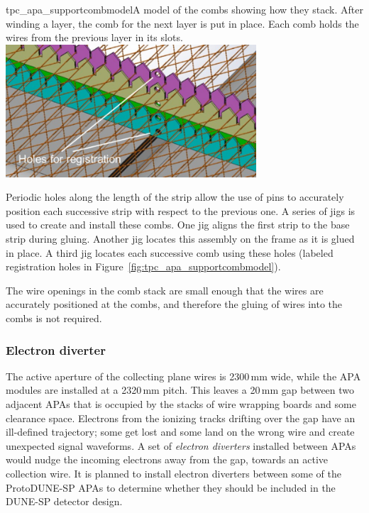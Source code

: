 \begin{cdrfigure}{tpc_apa_supportcombmodel}{A model of the combs showing how they stack.  After winding a layer, the comb for the next layer is put in place.  Each comb holds the wires from the previous layer in its slots.}
\includegraphics[width=0.7\textwidth]{figures/tpc_apa_supportcombmodel.png} 
\end{cdrfigure}

Periodic holes along the length of the strip allow the use of pins to accurately position each successive strip with respect to the previous one.  A series of jigs is used to create and install these combs.  One jig aligns the first strip to the base strip during gluing.  Another jig locates this assembly on the frame as it is glued in place. A third jig locates each successive comb using these holes (labeled registration holes in Figure~\ref{fig:tpc_apa_supportcombmodel}).

The wire openings in the comb stack are small enough that the wires are accurately positioned at the combs, and therefore the gluing of wires into the combs is not required.

\subsubsection{Electron diverter}
\label{sec:apa:electrondiverter}
 
The active aperture of the collecting plane wires is 2300\,mm wide, while the APA modules are installed at a 2320\,mm pitch.  This leaves a 20\,mm gap between two adjacent APAs that is occupied by the stacks of wire wrapping boards and some clearance space. Electrons from the ionizing tracks drifting over the gap have an ill-defined trajectory; some get lost and some land on the wrong wire and create unexpected signal waveforms.  A set of \textit{electron diverters} installed between APAs would nudge the incoming electrons away from the gap, towards %
an active collection wire. It is planned to install electron diverters between some of the ProtoDUNE-SP APAs to determine whether they should be included in the DUNE-SP detector design.
 

